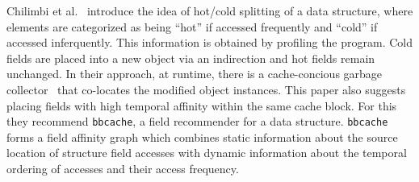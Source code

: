 %
%
%
Chilimbi et al.~\cite{CSD} introduce the idea of hot/cold splitting of a data structure, where elements are categorized as being ``hot'' if accessed frequently and ``cold'' if accessed inferquently.
This information is obtained by profiling the program. Cold fields are placed into a new object via an indirection and hot fields remain unchanged. In their approach, at runtime, there is a cache-concious garbage collector~\cite{ccgarbage} that co-locates the modified object instances.
This paper also suggests placing fields with high temporal affinity within the same cache block. For this they recommend  \texttt{bbcache}, a field recommender for a data structure. \texttt{bbcache} forms a field affinity graph which combines static information about the source location of structure field accesses with dynamic information about the temporal ordering of accesses and their access frequency.


